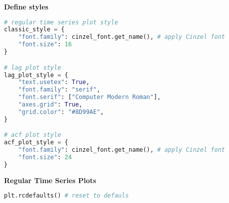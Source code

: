 {\noindent\hspace{-12.5pt}\normalsize\bfseries Define styles}\vspace{-10pt}
\begin{center}
  \begin{lstlisting}[language=Python]
# regular time series plot style
classic_style = {
    "font.family": cinzel_font.get_name(), # apply Cinzel font
    "font.size": 16
}

# lag plot style
lag_plot_style = {
    "text.usetex": True,
    "font.family": "serif",
    "font.serif": ["Computer Modern Roman"],
    "axes.grid": True,
    "grid.color": "#8D99AE",
}

# acf plot style
acf_plot_style = {
    "font.family": cinzel_font.get_name(), # apply Cinzel font
    "font.size": 24
}
  \end{lstlisting}
\end{center}


\begin{center}
  \noindent\normalsize\bfseries
  Regular Time Series Plots
\end{center}\vspace{-17.5pt}

\begin{center}
  \begin{lstlisting}[language=Python]
plt.rcdefaults() # reset to defauls
  \end{lstlisting}
\end{center}

